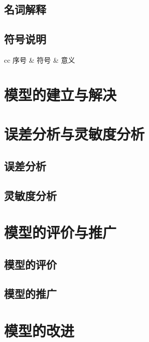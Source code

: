 \documentclass[withoutpreface,bwprint]{cumcmthesis} %
\begin{document}
	\subsection{名词解释}
	\subsection{符号说明}

\begin{table}[!htp]
\centering
\caption{本文所用符号的相关说明与解释}\label{Tab:1}
\begin{tabular}{cc}
 \toprule[1.5pt]
序号 &	符号 &   意义 \\ 
\midrule

\bottomrule[1.5pt]
\end{tabular}
\end{table}

\section{模型的建立与解决}

\section{误差分析与灵敏度分析}
	\subsection{误差分析}

	\subsection{灵敏度分析}

\section{模型的评价与推广}
	\subsection{模型的评价}

	\subsection{模型的推广}

\section{模型的改进}
\end{document}
